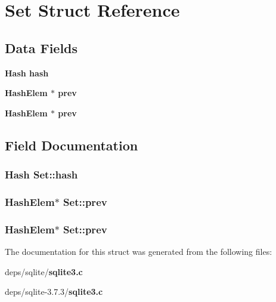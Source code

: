 \section{Set Struct Reference}
\label{structSet}
\subsection*{Data Fields}
\begin{CompactItemize}
\item 
\bf{Hash} \bf{hash}
\item 
\bf{Hash\-Elem} $\ast$ \bf{prev}
\item 
\bf{Hash\-Elem} $\ast$ \bf{prev}
\end{CompactItemize}


\subsection{Field Documentation}
\subsubsection{\setlength{\rightskip}{0pt plus 5cm}\bf{Hash} \bf{Set::hash}}\label{structSet_7e895fe836eb9d07cc450c0410b03090}


\subsubsection{\setlength{\rightskip}{0pt plus 5cm}\bf{Hash\-Elem}$\ast$ \bf{Set::prev}}\label{structSet_a44142a672f84d43445e9a2a5e1f192f}


\subsubsection{\setlength{\rightskip}{0pt plus 5cm}\bf{Hash\-Elem}$\ast$ \bf{Set::prev}}\label{structSet_a44142a672f84d43445e9a2a5e1f192f}




The documentation for this struct was generated from the following files:\begin{CompactItemize}
\item 
deps/sqlite/\bf{sqlite3.c}\item 
deps/sqlite-3.7.3/\bf{sqlite3.c}\end{CompactItemize}
